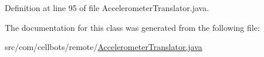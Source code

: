 Definition at line 95 of file Accelerometer\-Translator.\-java.



The documentation for this class was generated from the following file\-:\begin{DoxyCompactItemize}
\item 
src/com/cellbots/remote/\hyperlink{_accelerometer_translator_8java}{Accelerometer\-Translator.\-java}\end{DoxyCompactItemize}
